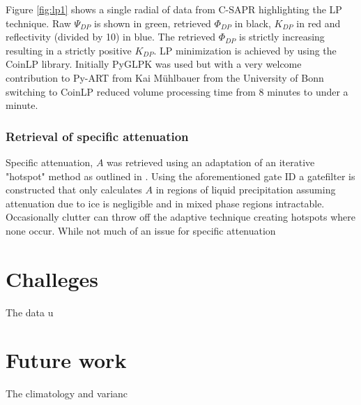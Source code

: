 \documentclass[twocol]{ametsoc}
\begin{document}
Figure \ref{fig:lp1} shows a single radial of data from C-SAPR highlighting the LP technique. Raw $\Psi_{DP}$ is shown in green, retrieved $\Phi_{DP}$ in black, $K_{DP}$ in red and reflectivity (divided by 10) in blue. The retrieved  $\Phi_{DP}$ is strictly increasing resulting in a strictly positive $K_{DP}$. LP minimization is achieved by using the CoinLP library. Initially PyGLPK was used but with a very welcome contribution to Py-ART from Kai M{\"u}hlbauer from the University of Bonn switching to CoinLP reduced volume processing time from 8 minutes to under a minute.  

\subsubsection{Retrieval of specific attenuation}
\label{sssec:ac}
Specific attenuation, $A$ was retrieved using an adaptation of an iterative "hotspot" method as outlined in \cite{gu_polarimetric_2011}. Using the aforementioned gate ID a gatefilter is constructed that only calculates $A$ in regions of liquid precipitation assuming attenuation due to ice is negligible and in mixed phase regions intractable. Occasionally clutter can throw off the adaptive technique creating hotspots where none occur. While not much of an issue for specific attenuation 


\section{Challeges}
The data u

\section{Future work}
The climatology and varianc

\end{document}
